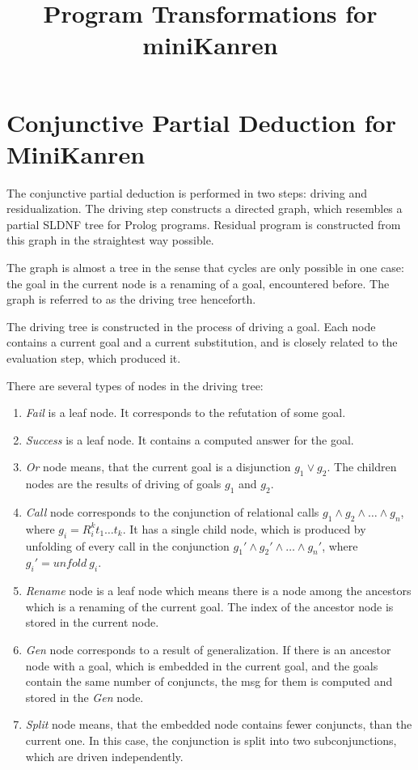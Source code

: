 \documentclass{llncs}
\begin{document}
\mainmatter

\title{Program Transformations for miniKanren}

\maketitle

\section{Conjunctive Partial Deduction for MiniKanren}

The conjunctive partial deduction is performed in two steps: driving and residualization. 
The driving step constructs a directed graph, which resembles a partial SLDNF tree for Prolog programs. Residual program is constructed from this graph in the straightest way possible.

The graph is almost a tree in the sense that cycles are only possible in one case: the goal in the current node is a renaming of a goal, encountered before. The graph is referred to as the driving tree henceforth.

The driving tree is constructed in the process of driving a goal. Each node contains a current goal and a current substitution, and is closely related to the evaluation step, which produced it. 

There are several types of nodes in the driving tree:

\begin{enumerate}
  \item \emph{Fail} is a leaf node. It corresponds to the refutation of some goal.
  \item \emph{Success} is a leaf node. It contains a computed answer for the goal.
  \item \emph{Or} node means, that the current goal is a disjunction $g_1 \vee   g_2$. The children nodes are the results of driving of goals $g_1$ and $g_2$. 
  \item \emph{Call} node corresponds to the conjunction of relational calls $g_1 \wedge g_2 \wedge \dots \wedge g_n$, where $g_i = R^k_i t_1 \dots t_k$. It has a single child node, which is produced by unfolding of every call in the conjunction $g_1' \wedge g_2' \wedge \dots \wedge g_n'$, where $g_i' = unfold \ g_i$.
  \item \emph{Rename} node is a leaf node which means there is a node among the ancestors which is a renaming of the current goal. The index of the ancestor node is stored in the current node. 
  \item \emph{Gen} node corresponds to a result of generalization. If there is an ancestor node with a goal, which is embedded in the current goal, and the goals contain the same number of conjuncts, the msg for them is computed and stored in the \emph{Gen} node. 
  \item \emph{Split} node means, that the embedded node contains fewer conjuncts, than the current one. In this case, the conjunction is split into two subconjunctions, which are driven independently. 
\end{enumerate}
\end{document}
